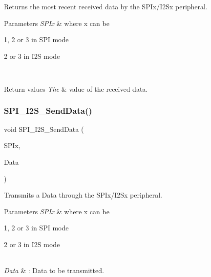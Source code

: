 Returns the most recent received data by the S\+P\+Ix/\+I2\+Sx peripheral. 


\begin{DoxyParams}{Parameters}
{\em S\+P\+Ix} & where x can be
\begin{DoxyItemize}
\item 1, 2 or 3 in S\+PI mode
\item 2 or 3 in I2S mode 
\end{DoxyItemize}\\
\hline
\end{DoxyParams}

\begin{DoxyRetVals}{Return values}
{\em The} & value of the received data. \\
\hline
\end{DoxyRetVals}
\mbox{\label{group___s_p_i___private___functions_gad5af40bebe8dbe3fa8bd476489d7e3da}} 
\subsubsection{\texorpdfstring{SPI\_I2S\_SendData()}{SPI\_I2S\_SendData()}}
{\footnotesize\ttfamily void S\+P\+I\+\_\+\+I2\+S\+\_\+\+Send\+Data (\begin{DoxyParamCaption}\item[{\mbox{\hyperlink{struct_s_p_i___type_def}{S\+P\+I\+\_\+\+Type\+Def}} $\ast$}]{S\+P\+Ix,  }\item[{uint16\+\_\+t}]{Data }\end{DoxyParamCaption})}



Transmits a Data through the S\+P\+Ix/\+I2\+Sx peripheral. 


\begin{DoxyParams}{Parameters}
{\em S\+P\+Ix} & where x can be
\begin{DoxyItemize}
\item 1, 2 or 3 in S\+PI mode
\item 2 or 3 in I2S mode 
\end{DoxyItemize}\\
\hline
{\em Data} & \+: Data to be transmitted. \\
\hline
\end{DoxyParams}


